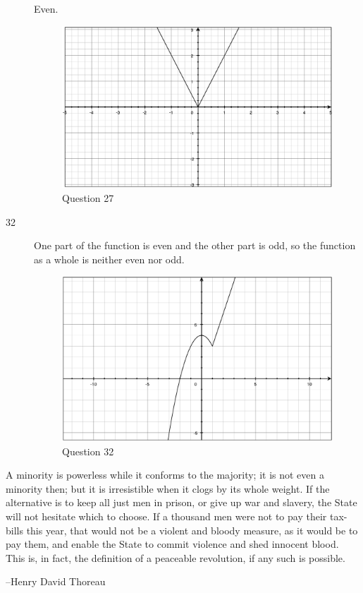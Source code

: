 \documentclass{exam}
\begin{document}
\begin{description}
Even.

\begin{figure}[H]
  \centering
  \includegraphics[scale=.3]{question_27.eps}
  \caption*{Question 27}
\end{figure}

\item[32]
One part of the function is even and the other part is odd, so the function as a whole is neither even nor odd. 

\begin{figure}[H]
  \centering
  \includegraphics[scale=.3]{question_32.eps}
  \caption*{Question 32}
\end{figure}

\end{description}

\else

\vspace{10 cm}

{\em 

A minority is powerless while it conforms to the majority; it is not even a minority then; but it is irresistible
  when it clogs by its whole weight. If the alternative is to keep all just men in prison, or give up war and slavery,
  the State will not hesitate which to choose. If a thousand men were not to pay their tax-bills this year, that would
  not be a violent and bloody measure, as it would be to pay them, and enable the State to commit violence and shed
  innocent blood. This is, in fact, the definition of a peaceable revolution, if any such is possible.  }

\vspace{.2 cm}

\hspace{1 cm} --Henry David Thoreau

\fi
\end{document}
